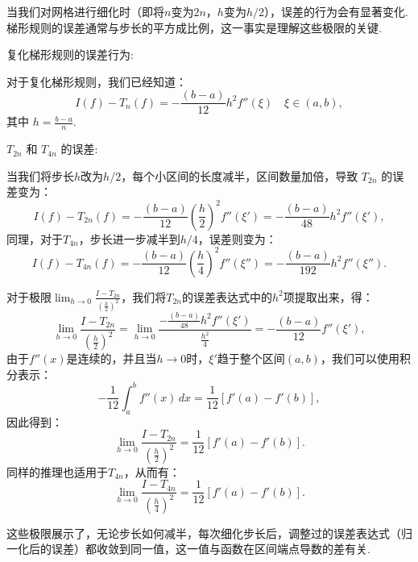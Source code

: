 \begin{tcolorbox}
当我们对网格进行细化时（即将$n$变为$2n$，$h$变为$h/2$），误差的行为会有显著变化.梯形规则的误差通常与步长的平方成比例，这一事实是理解这些极限的关键.

 复化梯形规则的误差行为:

对于复化梯形规则，我们已经知道：
$$
I(f) - T_n(f) = -\frac{(b-a)}{12} h^2 f''(\xi) \quad  \xi \in (a, b),
$$
其中 $h = \frac{b-a}{n}$.

 $T_{2n}$ 和 $T_{4n}$ 的误差:

当我们将步长$h$改为$h/2$，每个小区间的长度减半，区间数量加倍，导致 $T_{2n}$ 的误差变为：
$$
I(f) - T_{2n}(f) = -\frac{(b-a)}{12} \left(\frac{h}{2}\right)^2 f''(\xi') = -\frac{(b-a)}{48} h^2 f''(\xi'),
$$
同理，对于$T_{4n}$，步长进一步减半到$h/4$，误差则变为：
$$
I(f) - T_{4n}(f) = -\frac{(b-a)}{12} \left(\frac{h}{4}\right)^2 f''(\xi'') = -\frac{(b-a)}{192} h^2 f''(\xi'').
$$


对于极限$\displaystyle\lim_{h \rightarrow 0} \frac{I - T_{2n}}{\left(\frac{h}{2}\right)^2}$，我们将$T_{2n}$的误差表达式中的$h^2$项提取出来，得：
$$
\lim_{h \rightarrow 0} \frac{I - T_{2n}}{\left(\frac{h}{2}\right)^2} = \lim_{h \rightarrow 0} \frac{-\frac{(b-a)}{48} h^2 f''(\xi')}{\frac{h^2}{4}} = -\frac{(b-a)}{12} f''(\xi'),
$$
由于$f''(x)$是连续的，并且当$h \rightarrow 0$时，$\xi'$趋于整个区间$(a, b)$，我们可以使用积分表示：
$$
-\frac{1}{12} \int_{a}^{b} f''(x) \, dx = \frac{1}{12} [f'(a) - f'(b)],
$$
因此得到：
$$
\lim_{h \rightarrow 0} \frac{I - T_{2n}}{\left(\frac{h}{2}\right)^2} = \frac{1}{12} [f'(a) - f'(b)].
$$
同样的推理也适用于$T_{4n}$，从而有：
$$
\lim_{h \rightarrow 0} \frac{I - T_{4n}}{\left(\frac{h}{4}\right)^2} = \frac{1}{12} [f'(a) - f'(b)].
$$

这些极限展示了，无论步长如何减半，每次细化步长后，调整过的误差表达式（归一化后的误差）都收敛到同一值，这一值与函数在区间端点导数的差有关.
\end{tcolorbox}

